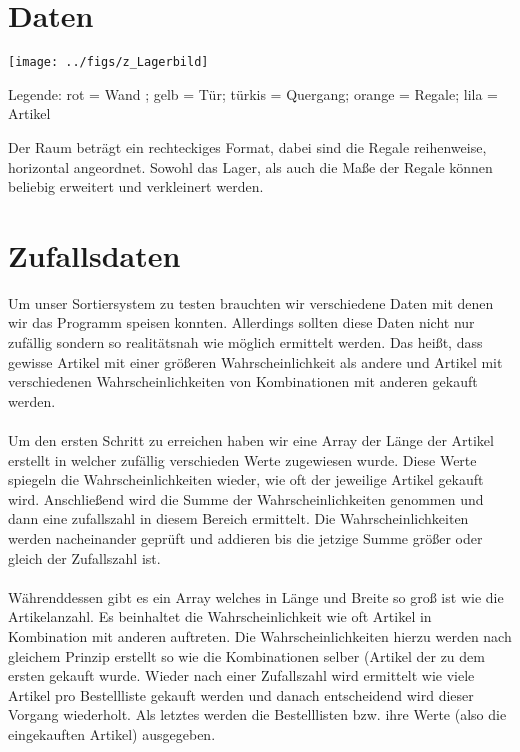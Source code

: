\documentclass[pagenumoff]{kit-document}
\begin{document}
	\section{Daten}

	\texttt{[image: ../figs/z\_Lagerbild]}

	Legende: rot = Wand ; gelb = Tür; türkis = Quergang; orange = Regale; lila = Artikel

Der Raum beträgt ein rechteckiges Format, dabei sind die Regale reihenweise, horizontal angeordnet. Sowohl das Lager, als auch die Maße der Regale können beliebig erweitert und verkleinert werden.

\section{Zufallsdaten}
Um unser Sortiersystem zu testen brauchten wir verschiedene Daten mit denen wir das Programm speisen konnten. Allerdings sollten diese Daten nicht nur zufällig sondern so realitätsnah wie möglich ermittelt werden. Das heißt, dass gewisse Artikel mit einer größeren Wahrscheinlichkeit als andere und Artikel mit verschiedenen Wahrscheinlichkeiten von Kombinationen mit anderen gekauft werden.\\
\\ Um den ersten Schritt zu erreichen haben wir eine Array der Länge der Artikel erstellt in welcher zufällig verschieden Werte zugewiesen wurde. Diese Werte spiegeln die Wahrscheinlichkeiten wieder, wie oft der jeweilige Artikel gekauft wird. Anschließend wird die Summe der Wahrscheinlichkeiten genommen und dann eine zufallszahl in diesem Bereich ermittelt. Die Wahrscheinlichkeiten werden nacheinander geprüft und addieren bis die jetzige Summe größer oder gleich der Zufallszahl ist.\\ 
\\Währenddessen gibt es ein Array welches in Länge und Breite so groß ist wie die Artikelanzahl. Es beinhaltet die Wahrscheinlichkeit wie oft Artikel in Kombination mit anderen auftreten. Die Wahrscheinlichkeiten hierzu werden nach gleichem Prinzip erstellt so wie die Kombinationen selber (Artikel der zu dem ersten gekauft wurde. Wieder nach einer Zufallszahl wird ermittelt wie viele Artikel pro Bestellliste gekauft werden und danach entscheidend wird dieser Vorgang wiederholt. Als letztes werden die Bestelllisten bzw. ihre Werte (also die eingekauften Artikel) ausgegeben.
	
\end{document}
